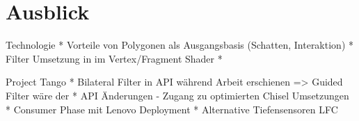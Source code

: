 \section{Ausblick}



Technologie
* Vorteile von Polygonen als Ausgangsbasis (Schatten, Interaktion)
* Filter Umsetzung in im Vertex/Fragment Shader
* 

Project Tango
* Bilateral Filter in API während Arbeit erschienen => Guided Filter wäre der
* API Änderungen - Zugang zu optimierten Chisel Umsetzungen
* Consumer Phase mit Lenovo Deployment
* Alternative Tiefensensoren LFC


	
	